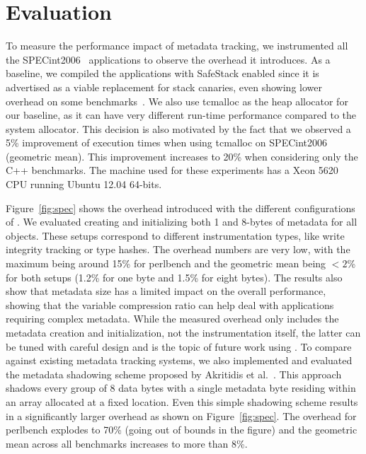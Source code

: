 \section{Evaluation}
\label{sec:evaluation}

To measure the performance impact of metadata tracking,
we instrumented all the SPECint2006~\cite{henning2006spec} applications to observe the
overhead it introduces. As a baseline, we compiled the applications with
SafeStack enabled since it is advertised as a viable replacement for stack
canaries, even showing lower overhead on some benchmarks~\cite{kuznetsov2014cpi}.
We also use tcmalloc as the heap allocator for our baseline, as it can have
very different run-time performance compared to the system allocator. This decision
is also motivated by the fact that we observed a 5\% improvement of execution
times when using tcmalloc on SPECint2006 (geometric mean). This improvement
increases to 20\% when considering only the C++ benchmarks. The machine used for these
experiments has a Xeon 5620 CPU running Ubuntu 12.04 64-bits.

Figure~\ref{fig:spec} shows the overhead introduced with the different configurations
of \projectname{}. We evaluated creating and initializing both 1 and 8-bytes of metadata
for all objects. These setups correspond to different instrumentation types,
like write integrity tracking or type hashes.
The overhead numbers are very low, with the maximum being around 15\% for perlbench and
the geometric mean being $<2$\% for both setups (1.2\% for one byte and 1.5\% for eight bytes). The results also show that metadata size has a
limited impact on the overall performance, showing that the variable compression ratio can help
deal with applications requiring complex metadata. While the measured overhead only includes
the metadata creation and initialization, not the instrumentation itself,
the latter can be tuned with careful design and is the topic
of future work using \projectname{}. To compare \projectname{} against existing metadata tracking
systems, we also implemented and evaluated the metadata shadowing scheme proposed by 
Akritidis et al.~\cite{akritidis2008preventing}. This approach shadows every group of 8
data bytes with a single metadata byte residing within an array allocated at a fixed location.
Even this simple shadowing scheme results in a significantly larger overhead as shown on Figure~\ref{fig:spec}.
The overhead for perlbench explodes to 70\% (going out of bounds in the figure) and the geometric mean across
all benchmarks increases to more than 8\%.

